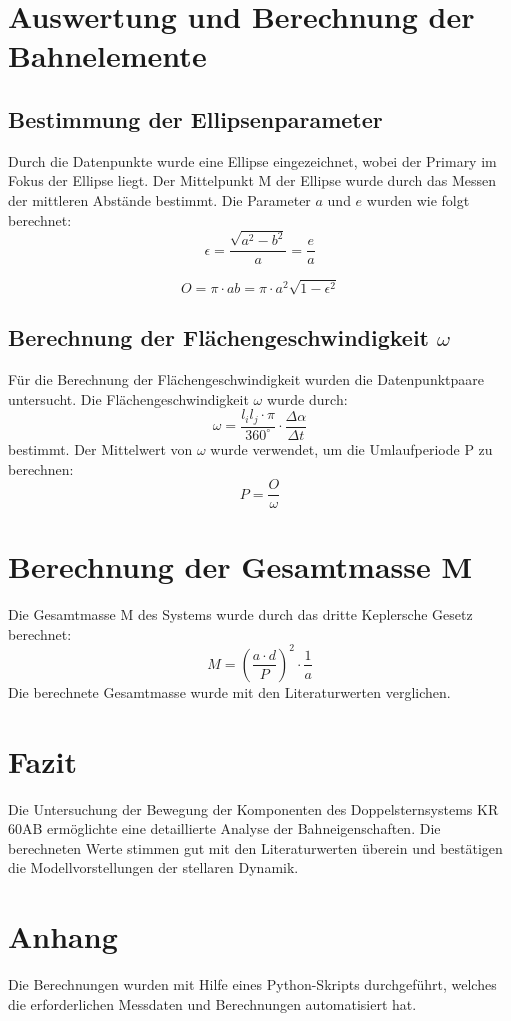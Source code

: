\documentclass[a4paper,12pt]{article}
\begin{document}
\section*{Auswertung und Berechnung der Bahnelemente}

\subsection*{Bestimmung der Ellipsenparameter}
Durch die Datenpunkte wurde eine Ellipse eingezeichnet, wobei der Primary im Fokus der Ellipse liegt. Der Mittelpunkt M der Ellipse wurde durch das Messen der mittleren Abstände bestimmt. Die Parameter \( a \) und \( e \) wurden wie folgt berechnet:
\[
\epsilon = \frac{\sqrt{a^2 - b^2}}{a} = \frac{e}{a}
\]

\[
O = \pi \cdot ab = \pi \cdot a^2 \sqrt{1 - \epsilon^2}
\]
\subsection*{Berechnung der Flächengeschwindigkeit \( \omega \)}

Für die Berechnung der Flächengeschwindigkeit wurden die Datenpunktpaare untersucht. Die Flächengeschwindigkeit \( \omega \) wurde durch:
\[
\omega = \frac{l_i l_j \cdot \pi}{360^\circ} \cdot \frac{\Delta\alpha}{\Delta t}
\]
bestimmt. Der Mittelwert von \( \omega \) wurde verwendet, um die Umlaufperiode P zu berechnen:
\[
P = \frac{O}{\omega}
\]
\section*{Berechnung der Gesamtmasse M}

Die Gesamtmasse M des Systems wurde durch das dritte Keplersche Gesetz berechnet:
\[
M = \left(\frac{a \cdot d}{P}\right)^2 \cdot \frac{1}{a}
\]
Die berechnete Gesamtmasse wurde mit den Literaturwerten verglichen.

\section*{Fazit}

Die Untersuchung der Bewegung der Komponenten des Doppelsternsystems KR 60AB ermöglichte eine detaillierte Analyse der Bahneigenschaften. Die berechneten Werte stimmen gut mit den Literaturwerten überein und bestätigen die Modellvorstellungen der stellaren Dynamik.
\section*{Anhang}
Die Berechnungen wurden mit Hilfe eines Python-Skripts durchgeführt, welches die erforderlichen Messdaten und Berechnungen automatisiert hat.
\end{document}
